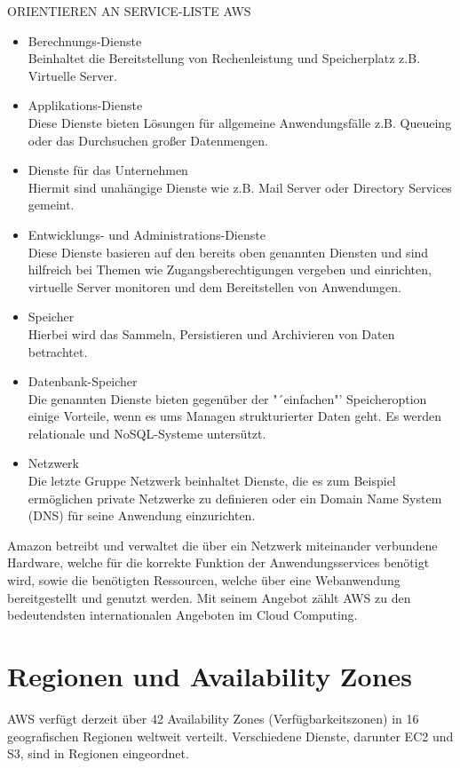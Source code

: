 {\color{red}ORIENTIEREN AN SERVICE-LISTE AWS}

\begin{itemize}
  \item Berechnungs-Dienste
  \\ Beinhaltet die Bereitstellung von Rechenleistung und Speicherplatz z.B. Virtuelle Server.
  \item Applikations-Dienste
  \\ Diese Dienste bieten Lösungen für allgemeine Anwendungsfälle z.B. Queueing oder das Durchsuchen großer Datenmengen.
  \item Dienste für das Unternehmen
  \\ Hiermit sind unahängige Dienste wie z.B. Mail Server oder Directory Services gemeint.
  \item Entwicklungs- und Administrations-Dienste
  \\ Diese Dienste basieren auf den bereits oben genannten Diensten und sind hilfreich bei Themen wie Zugangsberechtigungen vergeben und einrichten, virtuelle Server monitoren und dem Bereitstellen von Anwendungen.
  \item Speicher
  \\ Hierbei wird das Sammeln, Persistieren und Archivieren von Daten betrachtet.
  \item Datenbank-Speicher
  \\ Die genannten Dienste bieten gegenüber der "´einfachen"' Speicheroption einige Vorteile, wenn es ums Managen strukturierter Daten geht. Es werden relationale und NoSQL-Systeme untersützt.
  \item Netzwerk
  \\ Die letzte Gruppe Netzwerk beinhaltet Dienste, die es zum Beispiel ermöglichen private Netzwerke zu definieren oder ein Domain Name System (DNS) für seine Anwendung einzurichten.
\end{itemize} \cite{wittig:awsinaction}

Amazon betreibt und verwaltet
die über ein Netzwerk miteinander verbundene Hardware, welche für die korrekte
Funktion der Anwendungsservices benötigt wird, sowie die benötigten Ressourcen,
welche über eine Webanwendung bereitgestellt und genutzt werden. Mit seinem Angebot
zählt AWS zu den bedeutendsten internationalen Angeboten im Cloud Computing.


\section{Regionen und Availability Zones}
\label{sec:regions}
AWS verfügt derzeit über 42 Availability Zones (Verfügbarkeitszonen) in 16 geografischen Regionen weltweit verteilt. Verschiedene Dienste, darunter EC2 und S3, sind in Regionen eingeordnet.

